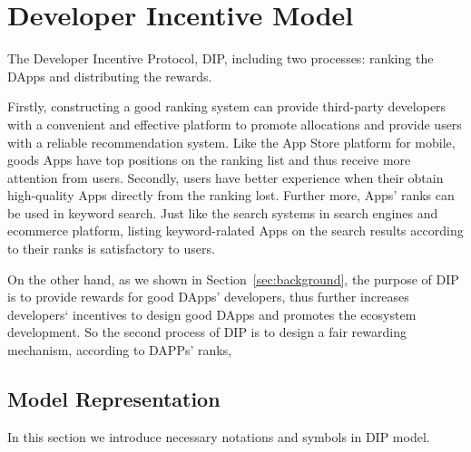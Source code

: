\section{Developer Incentive Model}
The Developer Incentive Protocol, DIP, including two processes: ranking the DApps and distributing the rewards.

Firstly, constructing a good ranking system can provide third-party developers with a convenient and effective  platform to promote allocations and provide users with a reliable recommendation system. Like the App Store platform for mobile, goods Apps have top positions on the ranking list and thus receive more attention from users. Secondly, users have better experience when their obtain high-quality Apps directly from the ranking lost. Further more, Apps' ranks can be used in keyword search. Just like the search systems in search engines and ecommerce platform,  listing keyword-ralated Apps on the search results according to their ranks is satisfactory to users.

On the other hand, as we shown in Section~\ref{sec:background}, the purpose of DIP is to provide rewards for good DApps' developers, thus further increases developers‘ incentives to design good DApps and promotes the ecosystem development. So the second process of DIP is to design a fair rewarding mechanism, according to DAPPs' ranks,

\subsection{Model Representation}
\label{subsection:parameters}
In this section we introduce necessary notations and symbols in DIP model.

